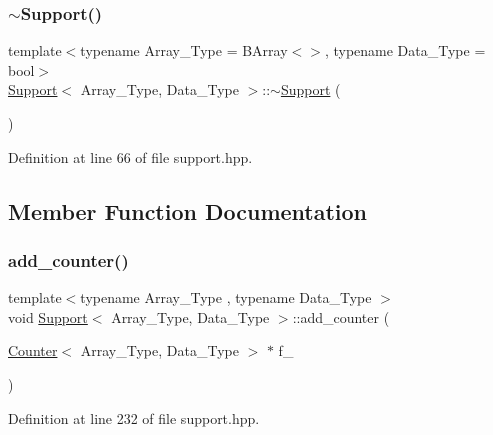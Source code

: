 \subsubsection{\texorpdfstring{$\sim$\+Support()}{~Support()}}
{\footnotesize\ttfamily template$<$typename Array\+\_\+\+Type = B\+Array$<$$>$, typename Data\+\_\+\+Type = bool$>$ \\
\hyperlink{class_support}{Support}$<$ Array\+\_\+\+Type, Data\+\_\+\+Type $>$\+::$\sim$\hyperlink{class_support}{Support} (\begin{DoxyParamCaption}{ }\end{DoxyParamCaption})\hspace{0.3cm}{\ttfamily [inline]}}



Definition at line 66 of file support.\+hpp.



\subsection{Member Function Documentation}
\mbox{\label{class_support_a0ad8bb6202451253697d771a28859210}} 
\subsubsection{\texorpdfstring{add\+\_\+counter()}{add\_counter()}\hspace{0.1cm}{\footnotesize\ttfamily [1/2]}}
{\footnotesize\ttfamily template$<$typename Array\+\_\+\+Type , typename Data\+\_\+\+Type $>$ \\
void \hyperlink{class_support}{Support}$<$ Array\+\_\+\+Type, Data\+\_\+\+Type $>$\+::add\+\_\+counter (\begin{DoxyParamCaption}\item[{\hyperlink{class_counter}{Counter}$<$ Array\+\_\+\+Type, Data\+\_\+\+Type $>$ $\ast$}]{f\+\_\+ }\end{DoxyParamCaption})\hspace{0.3cm}{\ttfamily [inline]}}



Definition at line 232 of file support.\+hpp.

\mbox{\label{class_support_aa8680937a0237286a8b0401bca07cbf6}} 
